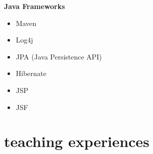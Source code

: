 \documentclass[]{friggeri-cv} %
\begin{document}
\begin{entrylist}
{		\textbf{Java Frameworks}
		\begin{itemize}
			\item Maven
			\item Log4j
			\item JPA (Java Persistence API)
			\item Hibernate
			\item JSP
			\item JSF
		\end{itemize}
	}



\end{entrylist}
\pagebreak


\section{teaching experiences}
\end{document}
